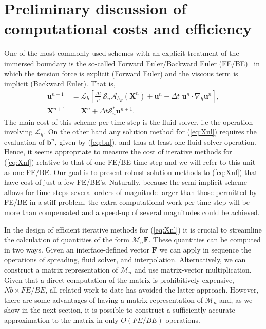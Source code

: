 \documentclass[preprint,12pt]{elsarticle}
\begin{document}
\section{Preliminary discussion of computational costs and efficiency} 
\label{Sec:Costs}
One of the most commonly used schemes with an explicit treatment of the immersed boundary is the 
so-called Forward Euler/Backward Euler (FE/BE)~\cite{SW99} in which the tension force is explicit (Forward Euler) and the 
viscous term is implicit (Backward Euler). That is,
\begin{align}
\mathbf{u}^{n+1} &= \mathcal{L}_h \left[\frac{\Delta t}{\rho}\, \mathcal{S}_n\mathcal{A}_{h_B}(\mathbf{X}^{n})+\mathbf{u}^n-\Delta t \, \, \mathbf{u}^n \cdot \nabla_h \mathbf{u}^n\right], \label{eq:FE} \\
\mathbf{X}^{n+1}&=\mathbf{X}^n +\Delta t\mathcal{S}^*_n\mathbf{u}^{n+1}. \label{eq:BE}
\end{align}
The main cost of this scheme per time step is the fluid solver, i.e the operation involving $\mathcal{L}_h$.  On the other hand
any solution method for (\ref{eq:Xnl}) requires the evaluation of $\mathbf{b}^n$, given by (\ref{eq:bn}), and thus  at
least one fluid solver operation. Hence, it seems appropriate to measure the cost of iterative methods for (\ref{eq:Xnl}) relative to that 
of one FE/BE time-step and we will refer to this unit as one FE/BE. 
Our goal is to present robust solution methods to (\ref{eq:Xnl}) that have cost of just a few FE/BE's. Naturally, 
because the semi-implicit scheme allows for time steps several orders of magnitude larger than those permitted by FE/BE in a stiff problem,  the extra computational work per time step will be more than compensated and a speed-up of several magnitudes could be achieved. 

In the design of efficient iterative methods for (\ref{eq:Xnl}) it is crucial to streamline the calculation of quantities of the form
$\mathcal{M}_n\mathbf{F}$. These quantities can be computed in two ways.  Given an interface-defined vector $\mathbf{F}$
we can apply in sequence the operations of spreading, fluid solver, and interpolation. Alternatively,  we can construct a matrix representation of $\mathcal{M}_n$ and use matrix-vector multiplication.  Given that a direct computation of the matrix
is prohibitively expensive, $Nb \times FE/BE$, all related work to date has avoided the latter approach.  However, 
there are some advantages of having a matrix representation of $\mathcal{M}_n$ and, as we show in the next section,  it is possible to
construct a sufficiently accurate approximation to the matrix in only $O(FE/BE)$ operations.
\end{document}

